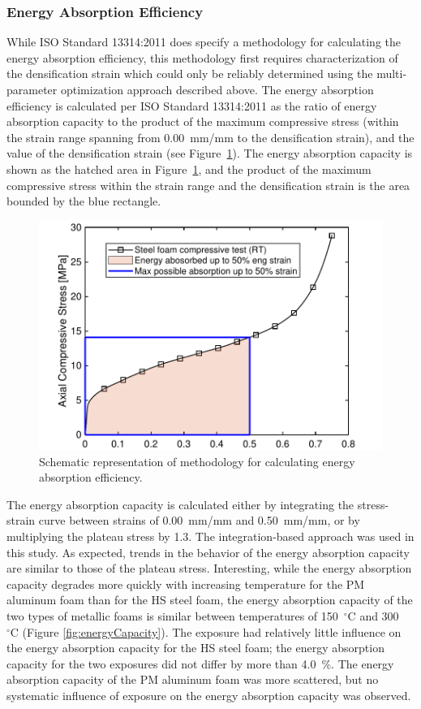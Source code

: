 \documentclass[review]{elsarticle}
\begin{document}
\subsubsection{Energy Absorption Efficiency}

While ISO Standard 13314:2011 does specify a methodology for calculating the energy absorption efficiency, this methodology first requires characterization of the densification strain which could only be reliably determined using the multi-parameter optimization approach described above. The energy absorption efficiency is calculated per ISO Standard 13314:2011 as the ratio of energy absorption capacity to the product of the maximum compressive stress (within the strain range spanning from 0.00~mm/mm to the densification strain), and the value of the densification strain (see Figure~\ref{EnAbsEffExpl}). The energy absorption capacity is shown as the hatched area in Figure~\ref{EnAbsEffExpl}, and the product of the maximum compressive stress within the strain range and the densification strain is the area bounded by the blue rectangle.

\begin{figure}[htbp]
	\begin{center}
		\includegraphics[width=0.60\linewidth]
		{Tex-Figures/Fig20-energyAbsorptionEfficiency.pdf}
		\vspace{-0.2cm}
		\caption{Schematic representation of methodology for calculating energy absorption efficiency.}
		\label{EnAbsEffExpl}
	\end{center}
\end{figure}

The energy absorption capacity is calculated either by integrating the stress-strain curve between strains of 0.00~mm/mm and 0.50~mm/mm, or by multiplying the plateau stress by 1.3. The integration-based approach was used in this study. As expected, trends in the behavior of the energy absorption capacity are similar to those of the plateau stress. Interesting, while the energy absorption capacity degrades more quickly with increasing temperature for the PM aluminum foam than for the HS steel foam, the energy absorption capacity of the two types of metallic foams is similar between temperatures of 150~$^\circ\mathrm{C}$ and 300~$^\circ\mathrm{C}$ (Figure \ref{fig:energyCapacity}). The exposure had relatively little influence on the energy absorption capacity for the HS steel foam; the energy absorption capacity for the two exposures did not differ by more than 4.0~\%. The energy absorption capacity of the PM aluminum foam was more scattered, but no systematic influence of exposure on the energy absorption capacity was observed.
\end{document}
